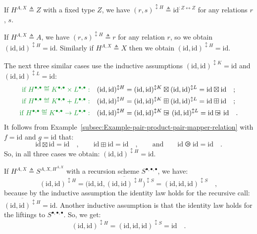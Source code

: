 If $H^{A,X}\triangleq Z$ with a fixed type $Z$, we have $(r,s)^{\updownarrow H}\triangleq\text{id}^{:Z\leftrightarrow Z}$
for any relations $r$, $s$.

If $H^{A,X}\triangleq A$, we have $(r,s)^{\updownarrow H}\triangleq r$
for any relation $r$, so we obtain $(\text{id},\text{id})^{\updownarrow H}=\text{id}$.
Similarly if $H^{A,X}\triangleq X$ then we obtain $(\text{id},\text{id})^{\updownarrow H}=\text{id}$.

The next three similar cases use the inductive assumptions $(\text{id},\text{id})^{\updownarrow K}=\text{id}$
and $(\text{id},\text{id})^{\updownarrow L}=\text{id}$:
\begin{align*}
{\color{greenunder}\text{if }H^{\bullet,\bullet}\triangleq K^{\bullet,\bullet}\times L^{\bullet,\bullet}:}\quad & (\text{id},\text{id})^{\updownarrow H}=(\text{id},\text{id})^{\updownarrow K}\boxtimes(\text{id},\text{id})^{\updownarrow L}=\text{id}\boxtimes\text{id}\quad;\\
{\color{greenunder}\text{if }H^{\bullet,\bullet}\triangleq K^{\bullet,\bullet}+L^{\bullet,\bullet}:}\quad & (\text{id},\text{id})^{\updownarrow H}=(\text{id},\text{id})^{\updownarrow K}\boxplus(\text{id},\text{id})^{\updownarrow L}=\text{id}\boxplus\text{id}\quad;\\
{\color{greenunder}\text{if }H^{\bullet,\bullet}\triangleq K^{\bullet,\bullet}\rightarrow L^{\bullet,\bullet}:}\quad & (\text{id},\text{id})^{\updownarrow H}=(\text{id},\text{id})^{\updownarrow K}\ogreaterthan(\text{id},\text{id})^{\updownarrow L}=\text{id}\ogreaterthan\text{id}\quad.
\end{align*}
It follows from Example~\ref{subsec:Example-pair-product-pair-mapper-relation}
with $f=\text{id}$ and $g=\text{id}$ that:
\[
\text{id}\boxtimes\text{id}=\text{id}\quad,\quad\quad\text{id}\boxplus\text{id}=\text{id}\quad,\quad\quad\text{and}\quad\quad\text{id}\ogreaterthan\text{id}=\text{id}\quad.
\]
So, in all three cases we obtain: $(\text{id},\text{id})^{\updownarrow H}=\text{id}$.

If $H^{A,X}\triangleq S^{A,X,H^{A,X}}$ with a recursion scheme $S^{\bullet,\bullet,\bullet}$,
we have:
\[
(\text{id},\text{id})^{\updownarrow H}=\big(\text{id},\text{id},\overline{(\text{id},\text{id})^{\updownarrow H}}\big)^{\updownarrow S}=(\text{id},\text{id},\text{id})^{\updownarrow S}\quad,
\]
because by the inductive assumption the identity law holds for the
recursive call: $\overline{(\text{id},\text{id})^{\updownarrow H}}=\text{id}$.
Another inductive assumption is that the identity law holds for the
liftings to $S^{\bullet,\bullet,\bullet}$. So, we get: 
\[
(\text{id},\text{id})^{\updownarrow H}=(\text{id},\text{id},\text{id})^{\updownarrow S}=\text{id}\quad.
\]

